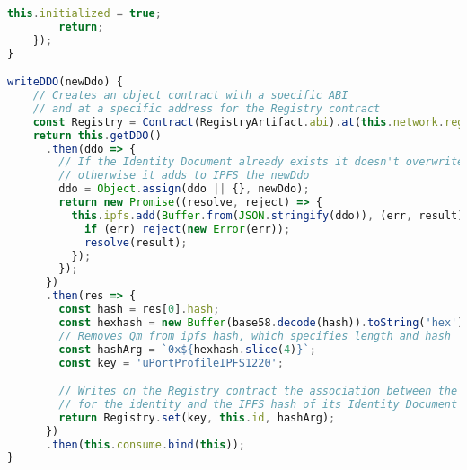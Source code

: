 \begin{lstlisting}[language=JavaScript]
        this.initialized = true;
        return;
    });
}

writeDDO(newDdo) {
    // Creates an object contract with a specific ABI 
    // and at a specific address for the Registry contract
    const Registry = Contract(RegistryArtifact.abi).at(this.network.registry);
    return this.getDDO()
      .then(ddo => {
        // If the Identity Document already exists it doesn't overwrite with the given one,
        // otherwise it adds to IPFS the newDdo
        ddo = Object.assign(ddo || {}, newDdo);
        return new Promise((resolve, reject) => {
          this.ipfs.add(Buffer.from(JSON.stringify(ddo)), (err, result) => {
            if (err) reject(new Error(err));
            resolve(result);
          });
        });
      })
      .then(res => {
        const hash = res[0].hash;
        const hexhash = new Buffer(base58.decode(hash)).toString('hex');
        // Removes Qm from ipfs hash, which specifies length and hash
        const hashArg = `0x${hexhash.slice(4)}`;
        const key = 'uPortProfileIPFS1220';

        // Writes on the Registry contract the association between the Proxy contract address
        // for the identity and the IPFS hash of its Identity Document which contains its pubkey
        return Registry.set(key, this.id, hashArg);
      })
      .then(this.consume.bind(this));
}
\end{lstlisting}
